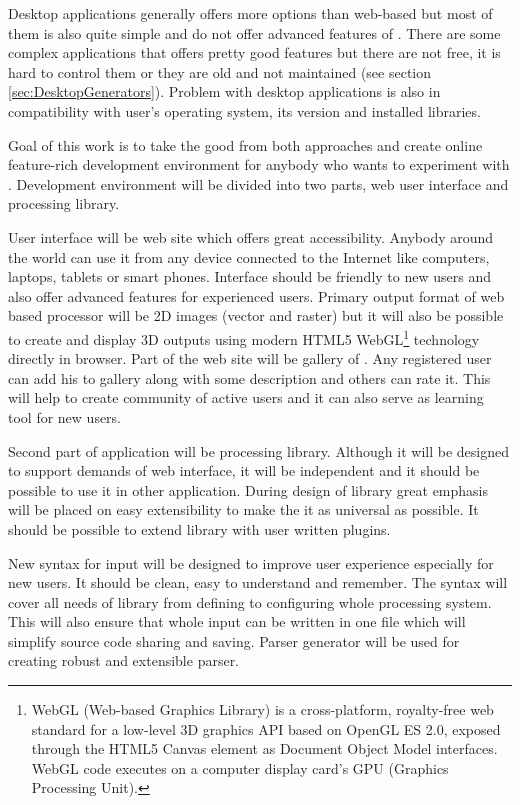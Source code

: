 Desktop applications generally offers more options than web-based but most of them is also quite simple and do not offer advanced features of \lsystems.
There are some complex applications that offers pretty good features but there are not free, it is hard to control them or they are old and not maintained (see section \ref{sec:DesktopGenerators}).
Problem with desktop applications is also in compatibility with user's operating system, its version and installed libraries.

Goal of this work is to take the good from both approaches and create online feature-rich development environment for anybody who wants to experiment with \lsystems.
Development environment will be divided into two parts, web user interface and \lsystem processing library.

User interface will be web site which offers great accessibility.
Anybody around the world can use it from any device connected to the Internet like computers, laptops, tablets or smart phones.
Interface should be friendly to new users and also offer advanced features for experienced users.
Primary output format of web based \lsystem processor will be 2D images (vector and raster) but it will also be possible to create and display 3D outputs using modern HTML5 WebGL\footnote{
	WebGL (Web-based Graphics Library) is a cross-platform, royalty-free web standard for a low-level 3D graphics API based on OpenGL ES 2.0, exposed through the HTML5 Canvas element as Document Object Model interfaces.
	WebGL code executes on a computer display card's GPU (Graphics Processing Unit).} technology directly in browser.
Part of the web site will be gallery of \lsystems.
Any registered user can add his \lsystem to gallery along with some description and others can rate it.
This will help to create community of active users and it can also serve as learning tool for new users.

Second part of application will be \lsystem processing library.
Although it will be designed to support demands of web interface, it will be independent and it should be possible to use it in other application.
During design of library great emphasis will be placed on easy extensibility to make the it as universal as possible.
It should be possible to extend library with user written plugins.

New syntax for input will be designed to improve user experience especially for new users.
It should be clean, easy to understand and remember.
The syntax will cover all needs of library from defining \lsystems to configuring whole processing system.
This will also ensure that whole input can be written in one file which will simplify source code sharing and saving.
Parser generator will be used for creating robust and extensible parser.


